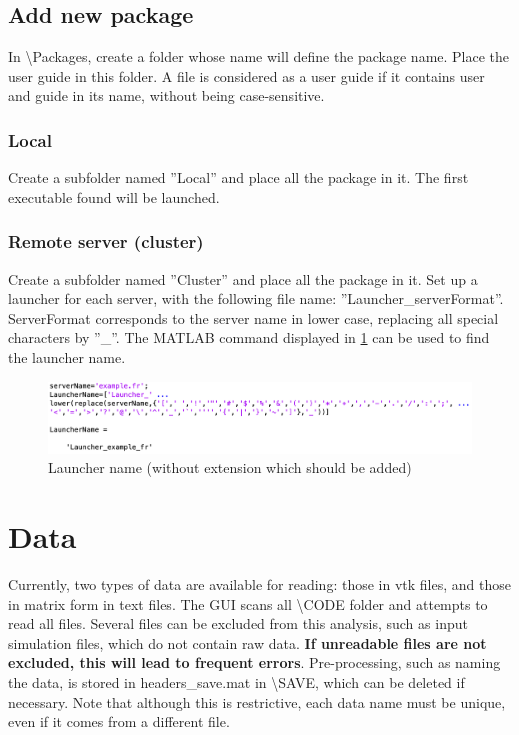 \documentclass{article}
\begin{document}
\subsection{Add new package}

In \textbackslash Packages, create a folder whose name will define the package name. Place the user guide in this folder.  A file is considered as a user guide if it contains user and guide in its name, without being case-sensitive.

\subsubsection{Local}

Create a subfolder named ''Local'' and place all the package in it. The first executable found will be launched.

\subsubsection{Remote server (cluster)}

Create a subfolder named ''Cluster'' and place all the package in it. Set up a launcher for each server, with the following file name: ''Launcher\_serverFormat''. ServerFormat corresponds to the server name in lower case, replacing all special characters by ''\_''. The MATLAB command displayed in \cref{launcherName} can be used to find the launcher name.

\begin{figure}[H]
\centering
\includegraphics[width=\textwidth]{launcherName.png}
\caption{Launcher name (without extension which should be added)}
\label{launcherName}
\end{figure}

\section{Data}

Currently, two types of data are available for reading: those in vtk files, and those in matrix form in text files. The GUI scans all \textbackslash CODE folder and attempts to read all files. Several files can be excluded from this analysis, such as input simulation files, which do not contain raw data. \textbf{If unreadable files are not excluded, this will lead to frequent errors}. Pre-processing, such as naming the data, is stored in headers\_save.mat in \textbackslash SAVE, which can be deleted if necessary. Note that although this is restrictive, each data name must be unique, even if it comes from a different file.
\end{document}
